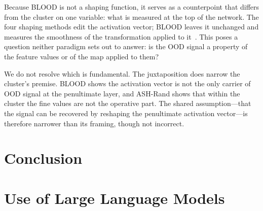 \documentclass[a4paper]{article}
\begin{document}
Because BLOOD is not a shaping function, it serves as a counterpoint that differs from
the cluster on one variable: what is measured at the top of the network. The four shaping
methods edit the activation vector; BLOOD leaves it unchanged and measures the smoothness
of the transformation applied to it~\citep{blood}. This poses a question neither paradigm
sets out to answer: is the OOD signal a property of the feature values or of the map
applied to them?

We do not resolve which is fundamental. The juxtaposition does narrow the cluster's
premise. BLOOD shows the activation vector is not the only carrier of OOD signal at the
penultimate layer, and ASH-Rand shows that within the cluster the fine values are not the
operative part. The shared assumption---that the signal can be recovered by reshaping the
penultimate activation vector---is therefore narrower than its framing, though not
incorrect.

\section{Conclusion}
\label{conc}






\section*{Use of Large Language Models}


\end{document}

